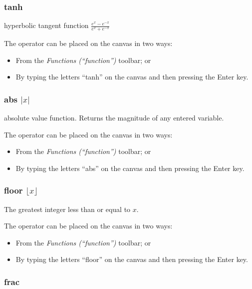 \subsubsection{tanh}


\label{Operation:tanh} hyperbolic tangent function $\frac{e^{x}-e^{-x}}{e^{x}+e^{-x}}$ 

The operator can be placed on the canvas in two ways:
\begin{itemize}
\item From the \emph{Functions (``function'')} toolbar; or 
\item By typing the letters ``tanh'' on the canvas and then pressing the
Enter key.
\end{itemize}

\subsubsection{abs $|x|$}


\label{Operation:abs} absolute value function. Returns the magnitude
of any entered variable.

The operator can be placed on the canvas in two ways:
\begin{itemize}
\item From the \emph{Functions (``function'')} toolbar; or 
\item By typing the letters ``abs'' on the canvas and then pressing the
Enter key.
\end{itemize}

\subsubsection{floor $\lfloor x\rfloor$}


\label{Operation:floor} The greatest integer less than or equal to
$x$. 

The operator can be placed on the canvas in two ways:
\begin{itemize}
\item From the \emph{Functions (``function'')} toolbar; or 
\item By typing the letters ``floor'' on the canvas and then pressing the
Enter key.
\end{itemize}

\subsubsection{frac}

